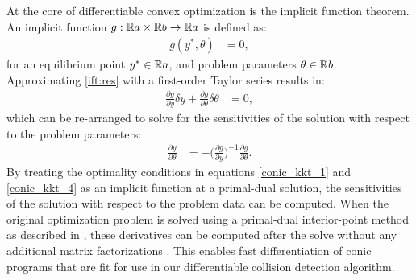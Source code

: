 At the core of differentiable convex optimization is the implicit function theorem. An implicit function $g:\mathbb{R}{a} \times \mathbb{R}{b} \rightarrow \mathbb{R}{a} $ is defined as:
\begin{align}
    g(y^*,\theta) &= 0 ,\label{ift:res}
\end{align}
for an equilibrium point $y^* \in \mathbb{R}{a}$, and problem parameters $\theta \in \mathbb{R}{b}$. Approximating \eqref{ift:res} with a first-order Taylor series results in: 
\begin{align}
    \frac{\partial g}{\partial y} \delta y + \frac{\partial g}{\partial \theta} \delta \theta &= 0 ,
\end{align}
which can be re-arranged to solve for the sensitivities of the solution with respect to the problem parameters:
\begin{align}
    \frac{\partial y}{\partial \theta} &= - \bigg( \frac{\partial g}{\partial y} \bigg)^{-1} \frac{\partial g}{\partial \theta}. \label{eq:ift}
\end{align}
By treating the optimality conditions in equations \eqref{conic_kkt_1} and \eqref{conic_kkt_4} as an implicit function at a primal-dual solution, the sensitivities of the solution with respect to the problem data can be computed. When the original optimization problem is solved using a primal-dual interior-point method as described in \cite{vandenberghe}, these derivatives can be computed after the solve without any additional matrix factorizations \cite{amos2019}.  This enables fast differentiation of conic programs that are fit for use in our differentiable collision detection algorithm.


